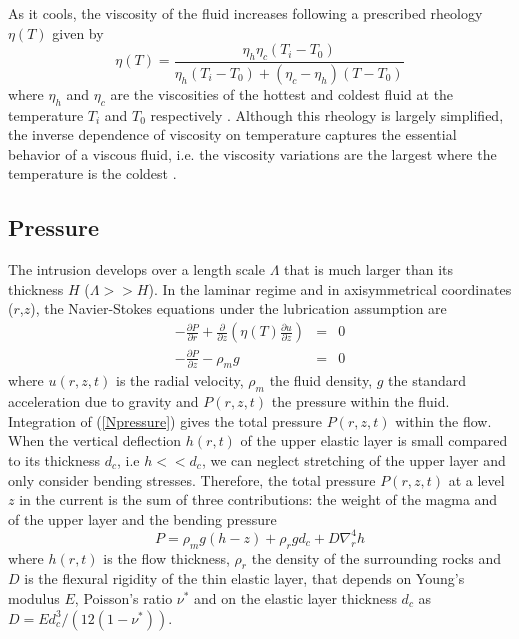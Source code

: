 As  it  cools,  the  viscosity  of the  fluid  increases  following  a
prescribed rheology $\eta(T)$ given by
\begin{equation}
  \eta(T)=\frac{\eta_h
    \eta_c(T_i-T_0)}{\eta_h(T_i-T_0)+(\eta_c-\eta_h)(T-T_0)}
  \label{rheology}
\end{equation}
where $\eta_h$  and $\eta_c$  are the viscosities  of the  hottest and
coldest  fluid  at  the   temperature  $T_i$  and  $T_0$  respectively
\citep{Bercovici:2007vc}.    Although   this   rheology   is   largely
simplified,  the  inverse  dependence   of  viscosity  on  temperature
captures  the  essential  behavior  of  a  viscous  fluid,  i.e.   the
viscosity  variations are  the largest  where the  temperature is  the
coldest
\citep{Anonymous:CZVBrBvv,Marsh:1981dc,Lejeune:1995fc,Giordano:2008em}.

\subsection{Pressure}
\label{sec:Pressure}

The  intrusion develops  over a  length scale  $\Lambda$ that  is much
larger than its thickness $H$ ($\Lambda >> H$).  In the laminar regime
and  in   axisymmetrical  coordinates  ($r$,$z$),   the  Navier-Stokes
equations under the lubrication assumption are
\begin{eqnarray}
  -\frac{\partial P}{\partial r}  +  \frac{\partial}{\partial z}\left(\eta(T) \frac{\partial u}{\partial z}\right) &=&0\label{V1} \\
  -\frac{\partial P}{\partial z}  - \rho_{m}g&  =&0\label{Npressure}
\end{eqnarray}
where $u(r,z,t)$ is the radial velocity, $\rho_m$ the fluid density, $g$
the standard acceleration  due to gravity and  $P(r,z,t)$ the pressure
within  the fluid.   Integration of  (\ref{Npressure}) gives the
total  pressure  $P(r,z,t)$  within   the  flow.   When  the  vertical
deflection $h(r,t)$  of the upper  elastic layer is small  compared to
its thickness  $d_c$, i.e $h<<d_c$,  we can neglect stretching  of the
upper layer and only consider  bending stresses.  Therefore, the total
pressure $P(r,z,t)$ at a level $z$ in  the current is the sum of three
contributions: the weight of the magma  and of the upper layer and the
bending pressure
\begin{equation}
  P = \rho_m g (h-z)+\rho_rgd_c+D\nabla_r^4h
\end{equation}
where  $h(r,t)$ is  the flow  thickness, $\rho_r$  the density  of the
surrounding rocks and $D$ is the flexural rigidity of the thin elastic
layer, that  depends on Young's  modulus $E$, Poisson's  ratio $\nu^*$
and     on     the     elastic    layer     thickness     $d_c$     as
$D  = Ed_c^3/\left(12(1-\nu^*)\right)$.

